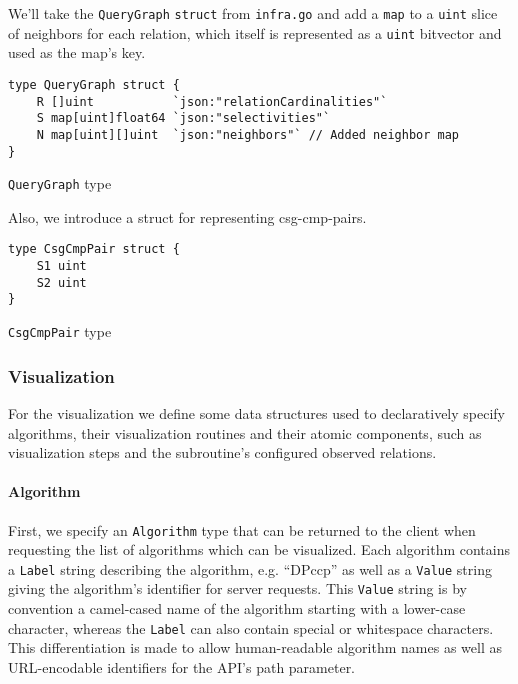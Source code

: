 We'll take the \texttt{QueryGraph} \texttt{struct} from \texttt{infra.go} and add a \texttt{map} to a \texttt{uint} slice of neighbors for each relation, which itself is represented as a \texttt{uint} bitvector and used as the map's key.

\begin{code}
\begin{verbatim}
type QueryGraph struct {
	R []uint           `json:"relationCardinalities"`
	S map[uint]float64 `json:"selectivities"`
	N map[uint][]uint  `json:"neighbors"` // Added neighbor map
}
\end{verbatim}
\caption{\texttt{QueryGraph} type}
\end{code}
\vspace{0.8cm}



Also, we introduce a struct for representing csg-cmp-pairs.
\begin{code}
\begin{verbatim}
type CsgCmpPair struct {
    S1 uint
    S2 uint
}
\end{verbatim}
\caption{\texttt{CsgCmpPair} type}
\label{datastructure:csg-cmp-pair}
\end{code}

\vspace{0.8cm}

\subsubsection{Visualization}

For the visualization we define some data structures used to declaratively specify algorithms, their visualization routines and their atomic components, such as visualization steps and the subroutine's configured observed relations. 

\paragraph{Algorithm}

First, we specify an \texttt{Algorithm} type that can be returned to the client when requesting the list of algorithms which can be visualized. Each algorithm contains a \texttt{Label} string describing the algorithm, e.g. ``DPccp'' as well as a \texttt{Value} string giving the algorithm's identifier for server requests. This \texttt{Value} string is by convention a camel-cased name of the algorithm starting with a lower-case character, whereas the \texttt{Label} can also contain special or whitespace characters. This differentiation is made to allow human-readable algorithm names as well as URL-encodable identifiers for the API's path parameter.

